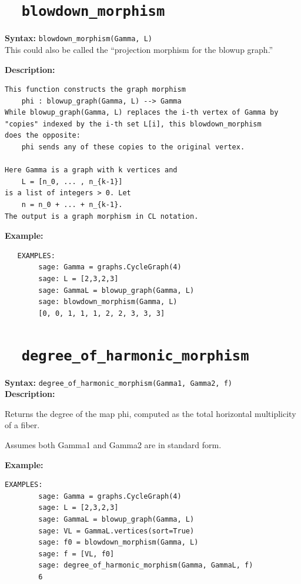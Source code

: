 \documentclass{article}
\begin{document}
\section{\tt \ \ blowdown\_morphism}

\textbf{Syntax:} \verb}blowdown_morphism(Gamma, L)}\\

This could also be called the ``projection morphism for the blowup graph.''

\textbf{Description:}
\begin{verbatim}
This function constructs the graph morphism
    phi : blowup_graph(Gamma, L) --> Gamma
While blowup_graph(Gamma, L) replaces the i-th vertex of Gamma by 
"copies" indexed by the i-th set L[i], this blowdown_morphism 
does the opposite: 
    phi sends any of these copies to the original vertex. 

Here Gamma is a graph with k vertices and 
    L = [n_0, ... , n_{k-1}]
is a list of integers > 0. Let
    n = n_0 + ... + n_{k-1}.
The output is a graph morphism in CL notation.

\end{verbatim}

\textbf{Example:}
\begin{verbatim}
   EXAMPLES:
        sage: Gamma = graphs.CycleGraph(4)      
        sage: L = [2,3,2,3]                         
        sage: GammaL = blowup_graph(Gamma, L)              
        sage: blowdown_morphism(Gamma, L)
        [0, 0, 1, 1, 1, 2, 2, 3, 3, 3]
\end{verbatim}

\section{\tt \ \ degree\_of\_harmonic\_morphism}

\textbf{Syntax:} \verb}degree_of_harmonic_morphism(Gamma1, Gamma2, f)}\\

\textbf{Description:}

Returns the degree of the map phi, computed as the total
    horizontal multiplicity of a fiber.

    Assumes both Gamma1 and Gamma2 are in standard form.

\textbf{Example:}
\begin{verbatim}
EXAMPLES:
        sage: Gamma = graphs.CycleGraph(4)
        sage: L = [2,3,2,3]
        sage: GammaL = blowup_graph(Gamma, L)
        sage: VL = GammaL.vertices(sort=True)
        sage: f0 = blowdown_morphism(Gamma, L)
        sage: f = [VL, f0]
        sage: degree_of_harmonic_morphism(Gamma, GammaL, f)
        6
\end{verbatim}
\end{document}
